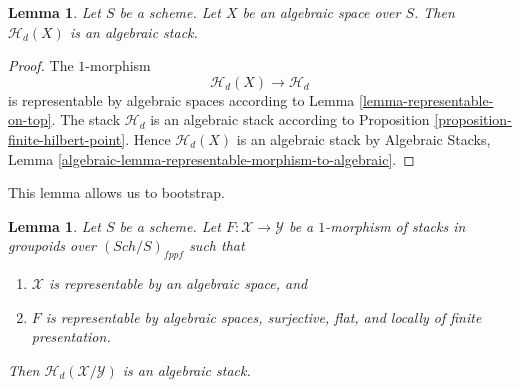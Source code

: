 \documentclass{stacks-project}
\theoremstyle{plain}
\newtheorem{lemma}[subsection]{Lemma}
\theoremstyle{definition}
\theoremstyle{remark}
\numberwithin{equation}{subsection}
\def\Sch{\mathit{Sch}}
\begin{document}
\begin{lemma}
\label{lemma-hilbert-stack-of-space}
Let $S$ be a scheme.
Let $X$ be an algebraic space over $S$.
Then $\mathcal{H}_d(X)$ is an algebraic stack.
\end{lemma}

\begin{proof}
The $1$-morphism
$$
\mathcal{H}_d(X) \longrightarrow \mathcal{H}_d
$$
is representable by algebraic spaces according to
Lemma \ref{lemma-representable-on-top}.
The stack $\mathcal{H}_d$ is an algebraic stack according to
Proposition \ref{proposition-finite-hilbert-point}.
Hence $\mathcal{H}_d(X)$ is an algebraic stack by
Algebraic Stacks,
Lemma \ref{algebraic-lemma-representable-morphism-to-algebraic}.
\end{proof}

\noindent
This lemma allows us to bootstrap.

\begin{lemma}
\label{lemma-hilbert-stack-relative-space}
Let $S$ be a scheme. Let $F : \mathcal{X} \to \mathcal{Y}$ be a $1$-morphism
of stacks in groupoids over $(\Sch/S)_{fppf}$ such that
\begin{enumerate}
\item $\mathcal{X}$ is representable by an algebraic space, and
\item $F$ is representable by algebraic spaces, surjective, flat, and
locally of finite presentation.
\end{enumerate}
Then $\mathcal{H}_d(\mathcal{X}/\mathcal{Y})$ is an algebraic stack.
\end{lemma}
\end{document}
